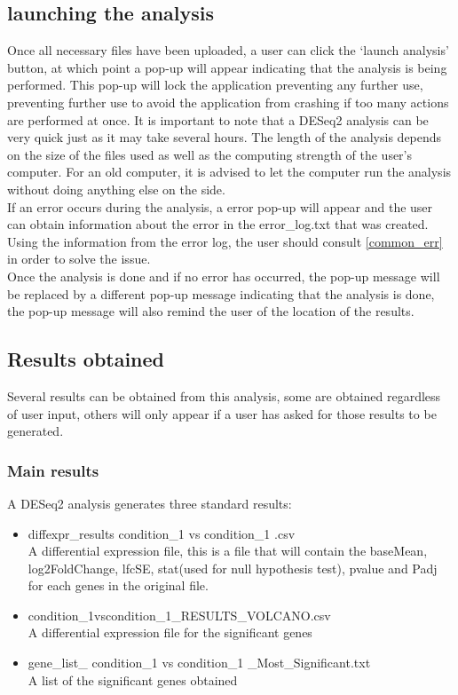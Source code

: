 \documentclass[11pt]{article}
\begin{document}
\subsection{launching the analysis}
Once all necessary files have been uploaded, a user can click the `launch analysis' button, at which point a pop-up will appear indicating that the analysis is being performed. This pop-up will lock the application preventing any further use, preventing further use to avoid the application from crashing if too many actions are performed at once.
It is important to note that a \acrshort{DESeq2} analysis can be very quick just as it may take several hours. The length of the analysis depends on the size of the files used as well as the computing strength of the user's computer. For an old computer, it is advised to let the computer run the analysis without doing anything else on the side.\\
If an error occurs during the analysis, a error pop-up will appear and the user can obtain information about the error in the error\_log.txt that was created. Using the information from the error log, the user should consult \autoref{common_err} in order to solve the issue.\\
Once the analysis is done and if no error has occurred, the pop-up message will be replaced by a different pop-up message indicating that the analysis is done, the pop-up message will also remind the user of the location of the results.
\subsection{Results obtained}
Several results can be obtained from this analysis, some are obtained regardless of user input, others will only appear if a user has asked for those results to be generated.
\subsubsection{Main results}
A \acrshort{DESeq2} analysis generates three standard results:
\begin{itemize}
\item diffexpr\_results condition\_1 vs condition\_1 .csv\\
A differential expression file, this is a file that will contain the baseMean, log2FoldChange, \acrshort{lfcSE}, stat(used for null hypothesis test), pvalue and \acrshort{Padj} for each genes in the original file.
\item condition\_1vscondition\_1\_RESULTS\_VOLCANO.csv\\
A differential expression file for the significant genes
\item gene\_list\_ condition\_1 vs condition\_1 \_Most\_Significant.txt\\
A list of the significant genes obtained
\end{itemize}
\end{document}
